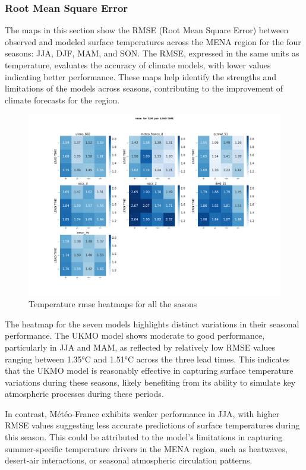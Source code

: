 \subsubsection{Root Mean Square Error}


The maps in this section show the RMSE (Root Mean Square Error) between observed and modeled surface temperatures across the MENA region for the four seasons: JJA, DJF, MAM, and SON. The RMSE, expressed in the same units as temperature, evaluates the accuracy of climate models, with lower values indicating better performance.  These maps help identify the strengths and limitations of the models across seasons, contributing to the improvement of climate forecasts for the region.
\begin{figure}[H]
    \centering
    \includegraphics[width=1\linewidth]{plots/det/rmse/rmse_T2M_mena.png}
    \caption{Temperature rmse heatmaps for all the sasons}
\end{figure}

The heatmap for the seven models highlights distinct variations in their seasonal performance. The UKMO model shows moderate to good performance, particularly in JJA and MAM, as reflected by relatively low RMSE values ranging between 1.35°C and 1.51°C across the three lead times. This indicates that the UKMO model is reasonably effective in capturing surface temperature variations during these seasons, likely benefiting from its ability to simulate key atmospheric processes during these periods.

In contrast, Météo-France exhibits weaker performance in JJA, with higher RMSE values suggesting less accurate predictions of surface temperatures during this season. This could be attributed to the model's limitations in capturing summer-specific temperature drivers in the MENA region, such as heatwaves, desert-air interactions, or seasonal atmospheric circulation patterns.

